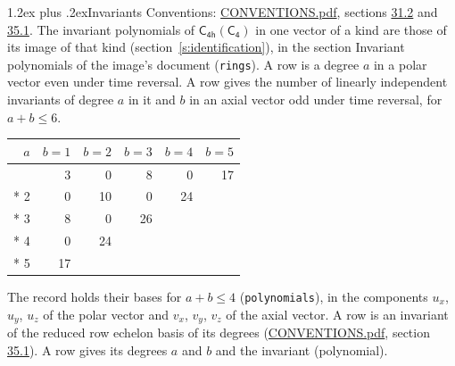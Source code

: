 \documentclass[10pt,a4paper]{article}
\makeatletter
\renewcommand\section{\@startsection{section}{1}{\z@}{-3ex plus -1ex minus -.2ex}%
  {1.2ex plus .2ex}{\normalfont\large\sffamily\bfseries\color{parttitle}}}
\numberwithin{equation}{section}
\newcommand{\grp}[1]{\mathsf{#1}}
\makeatother
\begin{document}
\section{Invariants}\label{s:invariants}
Conventions: \href{../../CONVENTIONS.pdf}{CONVENTIONS.pdf}, sections \href{../../CONVENTIONS.pdf\#conv.31.2}{31.2} and \href{../../CONVENTIONS.pdf\#conv.35.1}{35.1}.
The invariant polynomials of $\grp{C_{4h}}(\grp{C_{4}})$ in one vector of a kind are those of its image of that kind (section~\ref{s:identification}), in the section Invariant polynomials of the image's document (\texttt{rings}).
\leavevmode\label{n:index.degree.polar}\label{n:index.degree.axial}A row is a degree $a$ in a polar vector even under time reversal. A row gives the number of linearly independent invariants of degree $a$ in it and $b$ in an axial vector odd under time reversal, for $a + b \le 6$.
{\small\begin{longtable}{@{}rrrrrr@{}}\toprule
$a$ & $b = 1$ & $b = 2$ & $b = 3$ & $b = 4$ & $b = 5$\\\midrule\endhead
\bottomrule\endfoot\endlastfoot
1 & 3 & 0 & 8 & 0 & 17\\*
2 & 0 & 10 & 0 & 24 & \\*
3 & 8 & 0 & 26 &  & \\*
4 & 0 & 24 &  &  & \\*
5 & 17 &  &  &  & \\
\bottomrule\end{longtable}}
\leavevmode\label{n:local.component.polar}\label{n:local.component.axial}The record holds their bases for $a + b \le 4$ (\texttt{polynomials}), in the components $u_{x}$, $u_{y}$, $u_{z}$ of the polar vector and $v_{x}$, $v_{y}$, $v_{z}$ of the axial vector. \label{n:head.polynomial}A row is an invariant of the reduced row echelon basis of its degrees (\href{../../CONVENTIONS.pdf}{CONVENTIONS.pdf}, section \href{../../CONVENTIONS.pdf\#conv.35.1}{35.1}). A row gives its degrees $a$ and $b$ and the invariant (polynomial).
\end{document}
